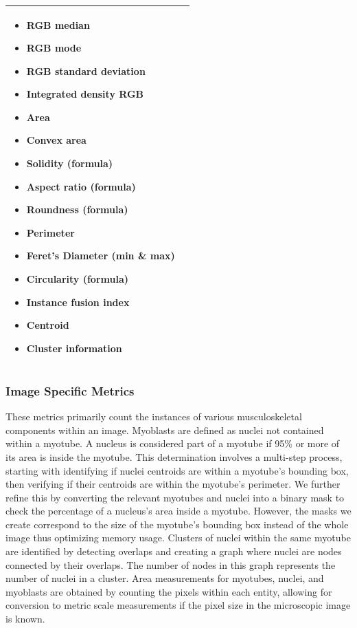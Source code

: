 \begin{table}[htbp]
\begin{tabular}{|l|l|}
\begin{minipage}[t]{0.45\linewidth}
\begin{itemize}[nosep,leftmargin=*]
				\item RGB median
				\item RGB mode
				\item RGB standard deviation
				\item Integrated density RGB
				\item Area
				\item Convex area
				\item Solidity (formula)
				\item Aspect ratio (formula)
				\item Roundness (formula)
				\item Perimeter
				\item Feret’s Diameter (min \& max)
				\item Circularity (formula)
				\item Instance fusion index
				\item Centroid
				\item Cluster information
			\end{itemize}
		\end{minipage} \\
		\hline
	\end{tabular}
	\label{tab:metrics}
\end{table}
\subsubsection{Image Specific Metrics}
These metrics primarily count the instances of various musculoskeletal components within an image. Myoblasts are defined as nuclei not contained within a myotube. A nucleus is considered part of a myotube if 95\% or more of its area is inside the myotube. This determination involves a multi-step process, starting with identifying if nuclei centroids are within a myotube's bounding box, then verifying if their centroids are within the myotube's perimeter. We further refine this by converting the relevant myotubes and nuclei into a binary mask to check the percentage of a nucleus's area inside a myotube. However, the masks we create correspond to the size of the myotube’s bounding box instead of the whole image thus optimizing memory usage. Clusters of nuclei within the same myotube are identified by detecting overlaps and creating a graph where nuclei are nodes connected by their overlaps. The number of nodes in this graph represents the number of nuclei in a cluster. Area measurements for myotubes, nuclei, and myoblasts are obtained by counting the pixels within each entity, allowing for conversion to metric scale measurements if the pixel size in the microscopic image is known.
